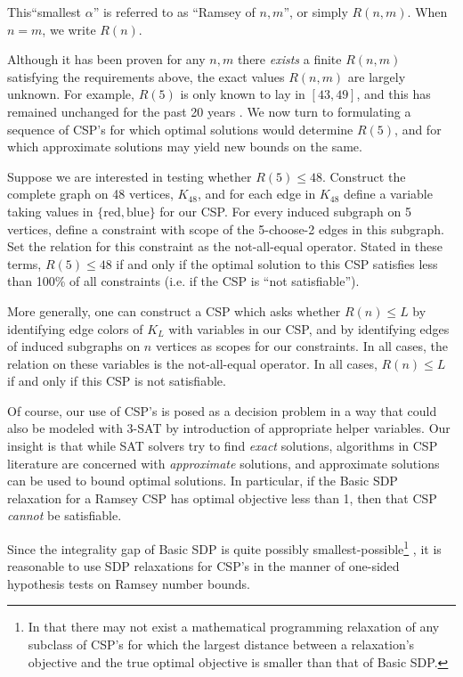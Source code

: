 \documentclass[12pt]{article} %
\begin{document}
This``smallest $\alpha$'' is referred to as ``Ramsey of $n,m$'', or simply $R(n,m)$. When $n = m$, we write $R(n)$.

Although it has been proven for any $n,m$ there \textit{exists} a finite $R(n,m)$ satisfying the requirements above, the exact values $R(n,m)$ are largely unknown. For example, $R(5)$ is only known to lay in $[43,49]$, and this has remained unchanged for the past 20 years \cite{rn}. We now turn to formulating a sequence of CSP's for which optimal solutions would determine $R(5)$, and for which approximate solutions may yield new bounds on the same.

Suppose we are interested in testing whether $R(5) \leq 48$. Construct the complete graph on 48 vertices, $K_{48}$, and for each edge in $K_{48}$ define a variable taking values in $\{\text{red},\text{blue}\}$ for our CSP. For every induced subgraph on 5 vertices, define a constraint with scope of the 5-choose-2 edges in this subgraph. Set the relation for this constraint as the not-all-equal operator. Stated in these terms, $R(5) \leq 48$ if and only if the optimal solution to this CSP satisfies less than 100\% of all constraints (i.e. if the CSP is ``not satisfiable'').

More generally, one can construct a CSP which asks whether $R(n) \leq L$ by identifying edge colors of $K_L$ with variables in our CSP, and by identifying edges of induced subgraphs on $n$ vertices as scopes for our constraints. In all cases, the relation on these variables is the not-all-equal operator. In all cases, $R(n) \leq L$ if and only if this CSP is not satisfiable.

Of course, our use of CSP's is posed as a decision problem in a way that could also be modeled with 3-SAT by introduction of appropriate helper variables. Our insight is that while SAT solvers try to find \textit{exact} solutions, algorithms in CSP literature are concerned with \textit{approximate} solutions, and approximate solutions can be used to bound optimal solutions. In particular, if the Basic SDP relaxation for a Ramsey CSP has optimal objective less than 1, then that CSP \textit{cannot} be satisfiable. 

Since the integrality gap of Basic SDP is quite possibly smallest-possible\footnote{In that there may not exist a mathematical programming relaxation of any subclass of CSP's for which the largest distance between a relaxation's objective and the true optimal objective is smaller than that of Basic SDP.} \cite{raghavendra2008optimal}, it is reasonable to use SDP relaxations for CSP's in the manner of one-sided hypothesis tests on Ramsey number bounds.
\end{document}

